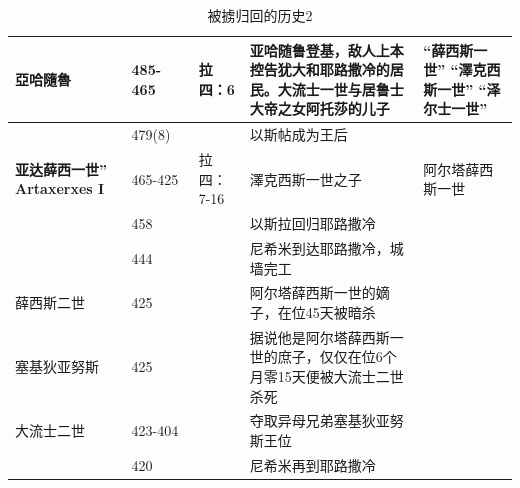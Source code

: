 \begin{table}[!hbp]
\begin{tabular}{|p{2.5cm}|p{1.7cm}|p{1.5cm}|p{}|p{2.8cm}|}
\textbf{亞哈隨魯}&	485-465	&	 \cite{亞哈隨魯}拉四：6 &亚哈随鲁登基，敌人上本控告犹大和耶路撒冷的居民。大流士一世与居鲁士大帝之女阿托莎的儿子& “薛西斯一世” “澤克西斯一世” “泽尔士一世” \\\hline	
&479(8)　& & 以斯帖成为王后&\\\hline
\textbf{亚达薛西一世” Artaxerxes I} &	465-425&拉四：7-16&澤克西斯一世之子&阿尔塔薛西斯一世\\\hline
&458&&以斯拉回归耶路撒冷	&\\\hline
&444&&尼希米到达耶路撒冷，城墙完工	&\\\hline
薛西斯二世	&425&&阿尔塔薛西斯一世的嫡子，在位45天被暗杀&\\\hline	
塞基狄亚努斯 	&425&&据说他是阿尔塔薛西斯一世的庶子，仅仅在位6个月零15天便被大流士二世杀死&\\\hline	
大流士二世	&423-404&&夺取异母兄弟塞基狄亚努斯王位&\\\hline
&420&&尼希米再到耶路撒冷	&\\\hline
								
\end{tabular}
\caption{被掳归回的历史2}
\end{table}


